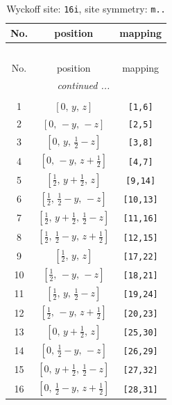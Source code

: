 \documentclass[fleqn,8pt]{jsarticle}
\begin{document}
\renewcommand{\arraystretch}{1.2}
\begin{longtable}{ccc}
\caption{Wyckoff site: {\tt 16i}, site symmetry: {\tt m..}}
 \\
 \hline \hline
No. & position & mapping \\ \hline \endfirsthead

\multicolumn{2}{l}{\tablename\ \thetable{}} \\
 \hline \hline
No. & position & mapping \\ \hline \endhead

 \hline \hline
\multicolumn{2}{r}{\footnotesize\it continued ...} \\ \endfoot

 \hline \hline
\multicolumn{2}{r}{} \\ \endlastfoot

1 & $\left[ 0,\, y,\, z \right]$ & {\tt [1,6]} \\ \hline
2 & $\left[ 0,\, - y,\, - z \right]$ & {\tt [2,5]} \\ \hline
3 & $\left[ 0,\, y,\, \frac{1}{2} - z \right]$ & {\tt [3,8]} \\ \hline
4 & $\left[ 0,\, - y,\, z + \frac{1}{2} \right]$ & {\tt [4,7]} \\ \hline
5 & $\left[ \frac{1}{2},\, y + \frac{1}{2},\, z \right]$ & {\tt [9,14]} \\ \hline
6 & $\left[ \frac{1}{2},\, \frac{1}{2} - y,\, - z \right]$ & {\tt [10,13]} \\ \hline
7 & $\left[ \frac{1}{2},\, y + \frac{1}{2},\, \frac{1}{2} - z \right]$ & {\tt [11,16]} \\ \hline
8 & $\left[ \frac{1}{2},\, \frac{1}{2} - y,\, z + \frac{1}{2} \right]$ & {\tt [12,15]} \\ \hline
9 & $\left[ \frac{1}{2},\, y,\, z \right]$ & {\tt [17,22]} \\ \hline
10 & $\left[ \frac{1}{2},\, - y,\, - z \right]$ & {\tt [18,21]} \\ \hline
11 & $\left[ \frac{1}{2},\, y,\, \frac{1}{2} - z \right]$ & {\tt [19,24]} \\ \hline
12 & $\left[ \frac{1}{2},\, - y,\, z + \frac{1}{2} \right]$ & {\tt [20,23]} \\ \hline
13 & $\left[ 0,\, y + \frac{1}{2},\, z \right]$ & {\tt [25,30]} \\ \hline
14 & $\left[ 0,\, \frac{1}{2} - y,\, - z \right]$ & {\tt [26,29]} \\ \hline
15 & $\left[ 0,\, y + \frac{1}{2},\, \frac{1}{2} - z \right]$ & {\tt [27,32]} \\ \hline
16 & $\left[ 0,\, \frac{1}{2} - y,\, z + \frac{1}{2} \right]$ & {\tt [28,31]} \\
\end{longtable}
\end{document}
